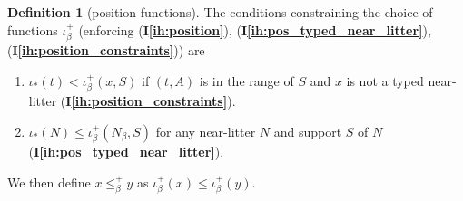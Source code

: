 \documentclass[112pt]{article}
\theoremstyle{definition}
\newtheorem{definition}[theorem]{Definition}
\theoremstyle{remark}
\newcommand{\ihref}[1]{(\textbf{I\ref{#1}})}
\newcommand{\rk}[1]{{\color{blue}\sl #1}}
\newcommand{\suggest}[1]{{\color{red} #1}}
\newcommand{\hsuggest}[1]{{\color{magenta}#1}}
\begin{document}
\begin{definition}[position functions]
\begin{comment}

\suggest{OMIT (with care):
$\iota_*^+(x,\emptyset)$ is defined as $\iota_*(\{x\})$. %
The well-ordering $\leq_{-1}^+$ is defined by $$(x,\emptyset) \leq_{-1}^+ (y,\emptyset) \leftrightarrow \iota_*(x) \leq \iota_*(y).$$}\hsuggest{GOOD CATCH!  I'm leaving this remark because it does need to be done carefully}

\hsuggest{This is genuinely tricky.  I suggest $\iota^+_*(x,\emptyset) = \iota_*(x)$.  I do not think that the constraints below act on choice of $\iota^+_*(x,\emptyset)$ at all.}

\end{comment}

\begin{comment}

The well-ordering $\leq_\alpha^+$ of $\tau_\alpha^+$ ($\alpha \in \lambda$) must satisfy the condition that for each $(x,S) \in \tau_\alpha^+$, for each $(z,A) \in {\tt rng}(S)$ and litter $L = f_{\beta,\gamma}(y,T)$ with $\beta<\alpha$,  where $L$  meets $z$, $\iota_*^+(y,T) < \iota_*^+(x,S)$ must hold.

\end{comment}

The conditions constraining the choice of functions $\iota^+_\beta$ %
 ({enforcing }\ihref{ih:position}, \ihref{ih:pos_typed_near_litter}, \ihref{ih:position_constraints}) are

\begin{enumerate}

\item $\iota_*(t) < \iota^+_\beta(x,S)$ if $(t,A)$ is in the range of $S$ and $x$ is not a typed near-litter {\ihref{ih:position_constraints}}.

\item $\iota_*(N) \leq \iota^+_\beta(N_\beta,S)$ for any near-litter $N$ and support $S$ of $N$ %
  \ihref{ih:pos_typed_near_litter}. %

\end{enumerate}

We then define $x \leq^+_\beta y$ as $\iota^+_\beta(x) \leq \iota^+_\beta(y)$.
\end{definition}
\end{document}
